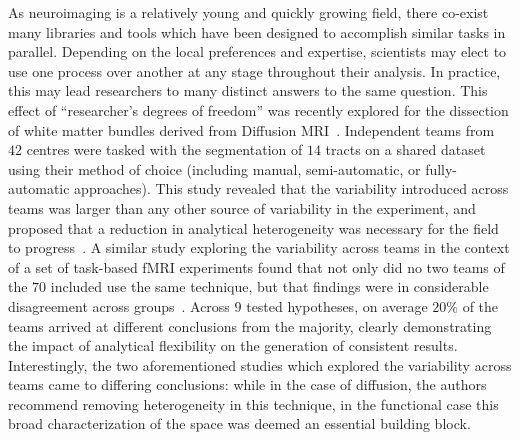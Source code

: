 As neuroimaging is a relatively young and quickly growing field, there co-exist many libraries and tools which have been
designed to accomplish similar tasks in parallel. Depending on the local preferences and expertise, scientists
may elect to use one process over another at any stage throughout their analysis. In practice, this may lead researchers
to many distinct answers to the same question. This effect of ``researcher's degrees of freedom'' was recently explored
for the dissection of white matter bundles derived from Diffusion MRI~\cite{schilling2020tractography}. Independent teams
from $42$ centres were tasked with the segmentation of $14$ tracts on a shared dataset using their method of choice
(including manual, semi-automatic, or fully-automatic approaches). This study revealed that the variability introduced
across teams was larger than any other source of variability in the experiment, and proposed that a reduction in
analytical heterogeneity was necessary for the field to progress~\cite{schilling2020tractography}. A similar study
exploring the variability across teams in the context of a set of task-based fMRI
experiments found that not only did no two teams of the $70$ included use the same technique, but that findings were in
considerable disagreement across groups~\cite{botvinik2020variability}. Across $9$ tested hypotheses, on average $20\%$
of the teams arrived at different conclusions from the majority, clearly demonstrating the impact of analytical
flexibility on the generation of consistent results. Interestingly, the two aforementioned studies which explored the
variability across teams came to differing conclusions: while in the case of diffusion, the authors recommend removing
heterogeneity in this technique, in the functional case this broad characterization of the space was deemed an essential
building block.

